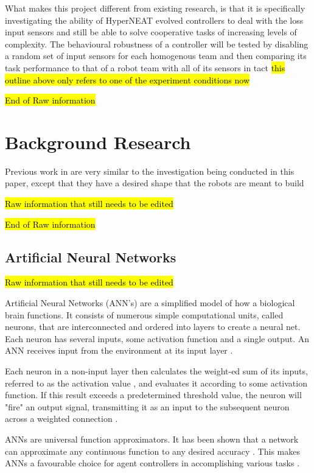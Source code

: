 \documentclass[conference]{IEEEtran}
\DeclareRobustCommand{\hlcyan}[1]{{\sethlcolor{cyan}\hl{#1}}}
\begin{document}
What makes this project different from existing research, is that it is specifically investigating the ability of HyperNEAT evolved controllers to deal with the loss input sensors and still be able to solve cooperative tasks of increasing levels of complexity.
The behavioural robustness of a controller will be tested by disabling a random set of input sensors for each homogenous team and then comparing its task performance to that of a robot team with all of its sensors in tact
\hlcyan{this outline above only refers to one of the experiment conditions now}

\hl{End of Raw information}


\section{Background Research}

Previous work in \cite{RefWorks:30} are very similar to the investigation being conducted in this paper, except that they have a desired shape that the robots are meant to build

\hl{Raw information that still needs to be edited}

\hl{End of Raw information}

\subsection{Artificial Neural Networks}

\hl{Raw information that still needs to be edited}

Artificial Neural Networks (ANN's) are a simplified model of how a biological brain functions\cite{mcculloch1943logical}. It consists of numerous simple computational units, called neurons, that are interconnected and ordered into layers to create a neural net\cite{RefWorks:31}. Each neuron has several inputs, some activation function and a single output. An ANN receives input from the environment at its input layer \cite{RefWorks:32}.

Each neuron in a non-input layer then calculates the weight-ed sum of its inputs, referred to as the activation value \cite{yegnanarayana2009artificial,RefWorks:31}, and evaluates it according to some activation function. If this result exceeds a predetermined threshold value, the neuron will "fire" an output signal, transmitting it as an input to the subsequent neuron across a weighted connection \cite{yegnanarayana2009artificial}.

ANNs are universal function approximators. It has been shown that a network can approximate any continuous function to any desired accuracy \cite{zhang1998forecasting}. This makes ANNs a favourable choice for agent controllers in accomplishing various tasks \cite{yegnanarayana2009artificial}.
\end{document}
